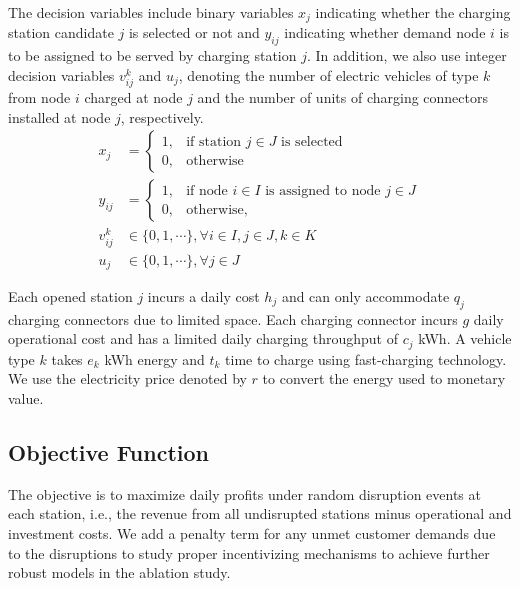 \documentclass[preprint]{oscmjournal}
\theoremstyle{remark}
\begin{document}
The decision variables include binary variables
$x_j$ indicating whether the charging station candidate $j$ is selected or not and $y_{ij}$ indicating whether demand node $i$ is to be assigned to be served by charging station $j$. In addition, we also use integer decision variables $v_{ij}^k$ and $u_j$, denoting the number of electric vehicles of type $k$ from node $i$ charged at node $j$ and the number of units of charging connectors installed at node $j$, respectively.
\begin{align}
x_j &= \begin{cases}
1, & \text{if station } j \in J \text{ is selected} \\
0, & \text{otherwise}
\end{cases} \\
y_{ij}&= \begin{cases}
1, & \text{if node } i \in I \text{ is assigned to node } j \in J\\
0, & \text{otherwise},
\end{cases} \\
v_{ij}^k &\in \{0, 1, \cdots\}, \forall i \in I, j \in J, k \in K \\
u_{j} &\in \{0, 1, \cdots\}, \forall j \in J
\end{align}

Each opened station $j$ incurs a daily cost $h_j$ and can only accommodate $q_j$ charging connectors due to limited space. Each charging connector incurs $g$ daily operational cost and has a limited daily charging throughput of $c_j$ kWh. A vehicle type $k$ takes $e_k$ kWh energy and $t_k$ time to charge using fast-charging technology. We use the electricity price denoted by $r$ to convert the energy used to monetary value. 


\subsection{Objective Function}
The objective is to maximize daily profits under random disruption events at each station, i.e., the revenue from all undisrupted stations minus operational and investment costs. We add a penalty term for any unmet customer demands due to the disruptions to study proper incentivizing mechanisms to achieve further robust models in the ablation study.
\end{document}
